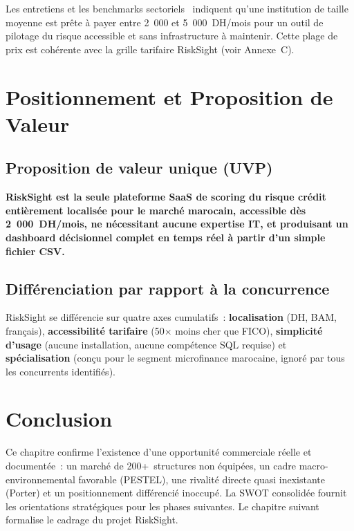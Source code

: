 \documentclass[12pt, a4paper]{report}
\begin{document}
Les entretiens et les benchmarks sectoriels~\cite{tp3_faisabilite} indiquent qu'une
institution de taille moyenne est prête à payer entre 2~000 et 5~000~DH/mois pour
un outil de pilotage du risque accessible et sans infrastructure à maintenir.
Cette plage de prix est cohérente avec la grille tarifaire RiskSight (voir
Annexe~C).

\newpage
\section{Positionnement et Proposition de Valeur}

\subsection{Proposition de valeur unique (UVP)}

\begin{tcolorbox}[successbox,title={Proposition de Valeur Unique de RiskSight}]
\textbf{RiskSight est la seule plateforme SaaS de scoring du risque crédit
entièrement localisée pour le marché marocain, accessible dès 2~000~DH/mois,
ne nécessitant aucune expertise IT, et produisant un dashboard décisionnel
complet en temps réel à partir d'un simple fichier CSV.}
\end{tcolorbox}

\subsection{Différenciation par rapport à la concurrence}

RiskSight se différencie sur quatre axes cumulatifs~: \textbf{localisation}
(DH, BAM, français), \textbf{accessibilité tarifaire} (50$\times$ moins cher que FICO),
\textbf{simplicité d'usage} (aucune installation, aucune compétence SQL requise) et
\textbf{spécialisation} (conçu pour le segment microfinance marocaine, ignoré par
tous les concurrents identifiés).

\section{Conclusion}

Ce chapitre confirme l'existence d'une opportunité commerciale réelle et documentée~:
un marché de 200+~structures non équipées, un cadre macro-environnemental favorable
(PESTEL), une rivalité directe quasi inexistante (Porter) et un positionnement
différencié inoccupé. La SWOT consolidée fournit les orientations stratégiques pour
les phases suivantes. Le chapitre suivant formalise le cadrage du projet RiskSight.
\end{document}
